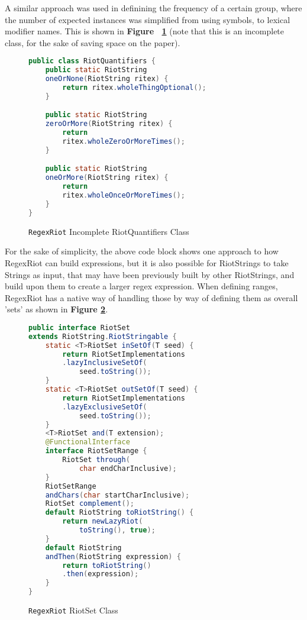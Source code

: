 \documentclass[conference]{IEEEtran}
\begin{document}
\vfill\eject

A similar approach was used in definining the frequency of a certain group,
where the number of expected instances was simplified from using symbols,
to lexical modifier names. This is shown in \textbf{Figure~ \ref{fig:regexriot-quantifiers}}
(note that this is an incomplete class, for the sake of saving space
on the paper).

\begin{figure}[htbp]
    \centering
    \label{fig:regexriot-quantifiers}
    \begin{lstlisting}[language=Java]
public class RiotQuantifiers {
    public static RiotString 
    oneOrNone(RiotString ritex) {
        return ritex.wholeThingOptional();
    }

    public static RiotString 
    zeroOrMore(RiotString ritex) {
        return 
        ritex.wholeZeroOrMoreTimes();
    }

    public static RiotString 
    oneOrMore(RiotString ritex) {
        return 
        ritex.wholeOnceOrMoreTimes();
    }
}
           \end{lstlisting}
    \caption{\texttt{RegexRiot} Incomplete RiotQuantifiers Class}
\end{figure}

For the sake of simplicity, the above code block shows one approach to how
RegexRiot can build expressions, but it is also possible for RiotStrings
to take Strings as input, that may have been previously built by other
RiotStrings, and build upon them to create a larger regex expression.
When defining ranges, RegexRiot has a native way of handling those by way
of defining them as overall 'sets' as shown in \textbf{Figure \ref{fig:regexriot-riotset}}.

\begin{figure}[htbp]
    \centering
    \label{fig:regexriot-riotset}
    \begin{lstlisting}[language=Java]
public interface RiotSet 
extends RiotString.RiotStringable {
    static <T>RiotSet inSetOf(T seed) {
        return RiotSetImplementations
        .lazyInclusiveSetOf(
            seed.toString());
    }
    static <T>RiotSet outSetOf(T seed) {
        return RiotSetImplementations
        .lazyExclusiveSetOf(
            seed.toString());
    }
    <T>RiotSet and(T extension);
    @FunctionalInterface
    interface RiotSetRange {
        RiotSet through(
            char endCharInclusive);
    }
    RiotSetRange 
    andChars(char startCharInclusive);
    RiotSet complement();
    default RiotString toRiotString() {
        return newLazyRiot(
            toString(), true);
    }
    default RiotString 
    andThen(RiotString expression) {
        return toRiotString()
        .then(expression);
    }
}
                   \end{lstlisting}
    \caption{\texttt{RegexRiot} RiotSet Class}
\end{figure}
\end{document}
